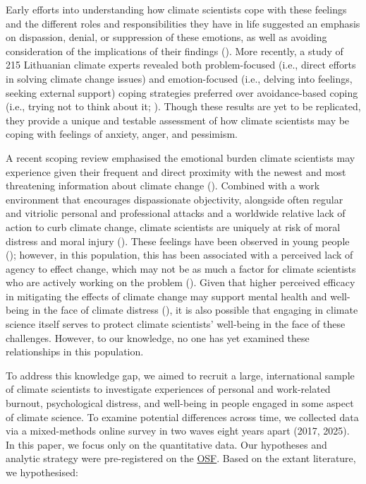 \documentclass[
  man,
  longtable,
  nolmodern,
  notxfonts,
  notimes,
  colorlinks=true,linkcolor=blue,citecolor=blue,urlcolor=blue]{apa7}
\begin{document}
Early efforts into understanding how climate scientists cope with these
feelings and the different roles and responsibilities they have in life
suggested an emphasis on dispassion, denial, or suppression of these
emotions, as well as avoiding consideration of the implications of their
findings (). More
recently, a study of 215 Lithuanian climate experts revealed both
problem-focused (i.e., direct efforts in solving climate change issues)
and emotion-focused (i.e., delving into feelings, seeking external
support) coping strategies preferred over avoidance-based coping (i.e.,
trying not to think about it;
). Though these results are yet to be replicated, they provide a
unique and testable assessment of how climate scientists may be coping
with feelings of anxiety, anger, and pessimism.

A recent scoping review emphasised the emotional burden climate
scientists may experience given their frequent and direct proximity with
the newest and most threatening information about climate change
().
Combined with a work environment that encourages dispassionate
objectivity, alongside often regular and vitriolic personal and
professional attacks and a worldwide relative lack of action to curb
climate change, climate scientists are uniquely at risk of moral
distress and moral injury (). These feelings have been observed in young people
(); however, in
this population, this has been associated with a perceived lack of
agency to effect change, which may not be as much a factor for climate
scientists who are actively working on the problem
(). Given
that higher perceived efficacy in mitigating the effects of climate
change may support mental health and well-being in the face of climate
distress (), it is
also possible that engaging in climate science itself serves to protect
climate scientists' well-being in the face of these challenges. However,
to our knowledge, no one has yet examined these relationships in this
population.

To address this knowledge gap, we aimed to recruit a large,
international sample of climate scientists to investigate experiences of
personal and work-related burnout, psychological distress, and
well-being in people engaged in some aspect of climate science. To
examine potential differences across time, we collected data via a
mixed-methods online survey in two waves eight years apart (2017, 2025).
In this paper, we focus only on the quantitative data. Our hypotheses
and analytic strategy were pre-registered on the
\href{https://osf.io/xegr7/registrations}{OSF}. Based on the extant
literature, we hypothesised:
\end{document}
